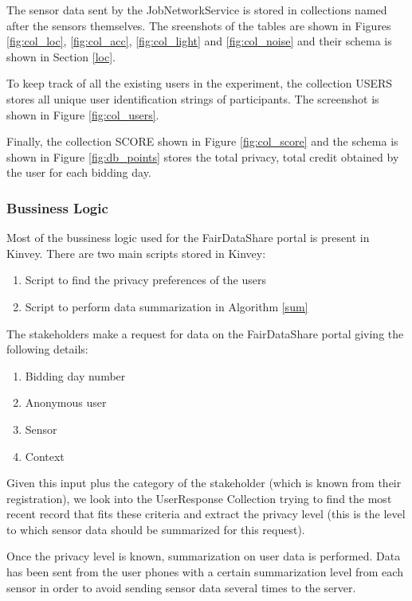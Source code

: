 The sensor data sent by the JobNetworkService is stored in collections named after the sensors themselves. The sreenshots of the tables
are shown in Figures \ref{fig:col_loc}, \ref{fig:col_acc}, \ref{fig:col_light} and \ref{fig:col_noise} and their schema is shown in Section \ref{loc}.

To keep track of all the existing users in the experiment, the collection USERS stores all unique user identification strings of participants.
The screenshot is shown in Figure \ref{fig:col_users}.

Finally, the collection SCORE shown in Figure \ref{fig:col_score} and the schema is shown in Figure \ref{fig:db_points} stores the total privacy, total credit obtained by the user for each bidding day.

\subsubsection{Bussiness Logic} \label{bl}
Most of the bussiness logic used for the FairDataShare portal is present in Kinvey. There are two main scripts stored in Kinvey:

\begin{enumerate}
    \item Script to find the privacy preferences of the users
    \item Script to perform data summarization in Algorithm \ref{sum}
\end{enumerate}

The stakeholders make a request for data on the FairDataShare portal giving the following details:

\begin{enumerate}
    \item Bidding day number
    \item Anonymous user
    \item Sensor
    \item Context
\end{enumerate}

Given this input plus the category of the stakeholder (which is known from their registration), we look into the UserResponse Collection trying to find the most recent record that
fits these criteria and extract the privacy level (this is the level to which sensor data should be summarized for this request).

Once the privacy level is known, summarization on user data is performed. Data has been sent from the user phones with a certain summarization level from each sensor in order to avoid sending sensor data several times to the server. 

